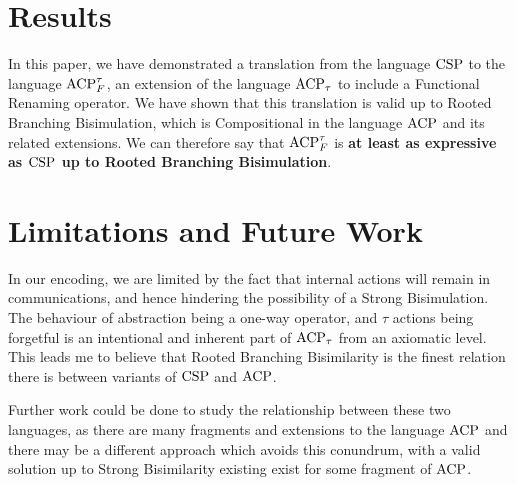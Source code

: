 \documentclass[../hons_project.tex]{subfiles}
\begin{document}
\section{Results}
In this paper, we have demonstrated a translation from the language $\mathrm{CSP}$ to the language $\mathrm{ACP}_{F}^{\tau}$, an extension of the language $\mathrm{ACP}_{\tau}$ to include a Functional Renaming operator. We have shown that this translation is valid up to Rooted Branching Bisimulation, which is Compositional in the language $\mathrm{ACP}$ and its related extensions. We can therefore say that $\mathrm{ACP}_{F}^{\tau}$ is \textbf{at least as expressive as $\mathrm{CSP}$ up to Rooted Branching Bisimulation}.

\section{Limitations and Future Work}
In our encoding, we are limited by the fact that internal actions will remain in communications, and hence hindering the possibility of a Strong Bisimulation. The behaviour of abstraction being a one-way operator, and $\tau$ actions being forgetful is an intentional and inherent part of $\mathrm{ACP}_{\tau}$ from an axiomatic level. This leads me to believe that Rooted Branching Bisimilarity is the finest relation there is between variants of $\mathrm{CSP}$ and $\mathrm{ACP}$.
    
Further work could be done to study the relationship between these two languages, as there are many fragments and extensions to the language $\mathrm{ACP}$ and there may be a different approach which avoids this conundrum, with a valid solution up to Strong Bisimilarity existing exist for some fragment of $\mathrm{ACP}$.
\end{document}
